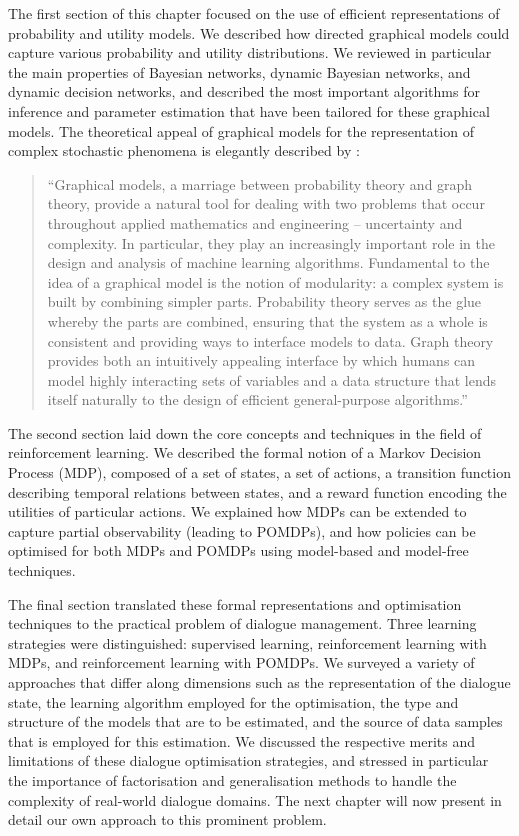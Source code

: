 The first section of this chapter focused on the use of efficient representations of probability and utility models.  We described how directed graphical models could capture various probability and utility distributions. We reviewed in particular the main properties of Bayesian networks, dynamic Bayesian networks, and dynamic decision networks, and described the most important algorithms for inference and parameter estimation that have been tailored for these graphical models. The theoretical appeal of graphical models for the representation of complex stochastic phenomena is elegantly described by \citet[][p. 1]{jordan1998}: 
\begin{quote}
 ``Graphical models, a marriage between probability theory and graph theory, provide a natural tool for dealing with two problems that occur throughout applied mathematics and engineering -- uncertainty and complexity. In particular, they play an increasingly important role in the design and analysis of machine learning algorithms. Fundamental to the idea of a graphical model is the notion of modularity: a complex system is built by combining simpler parts. Probability theory serves as the glue whereby the parts are combined, ensuring that the system as a whole is consistent and providing ways to interface models to data. Graph theory provides both an intuitively appealing interface by which humans can model highly interacting sets of variables and a data structure that lends itself naturally to the design of efficient general-purpose algorithms.''
 \end{quote}

The second section laid down the core concepts and techniques in the field of reinforcement learning.  We described the formal notion of a Markov Decision Process (MDP), composed of a set of states, a set of actions, a transition function describing temporal relations between states, and a reward function encoding the utilities of particular actions. We explained how MDPs can be extended to capture partial observability (leading to POMDPs), and how policies can be optimised for both MDPs and POMDPs using model-based and model-free techniques.

The final section translated these formal representations and optimisation techniques to the practical problem of dialogue management.  Three learning strategies were distinguished: supervised learning, reinforcement learning with MDPs, and reinforcement learning with POMDPs.  We surveyed a variety of approaches that differ along dimensions such as the representation of the dialogue state, the learning algorithm employed for the optimisation, the type and structure of the models that are to be estimated, and the source of data samples that is employed for this estimation. We discussed the respective merits and limitations of these dialogue optimisation strategies, and stressed in particular the importance of factorisation and generalisation methods to handle the complexity of real-world dialogue domains.  The next chapter will now present in detail our own approach to this prominent problem.

